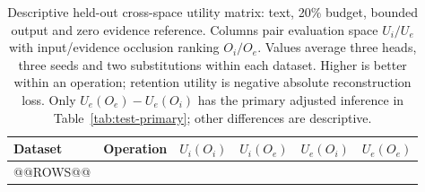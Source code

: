 \begin{table}[!htbp]\centering\small
\caption{Descriptive held-out cross-space utility matrix: text, 20\% budget, bounded output and zero evidence reference. Columns pair evaluation space $U_i/U_e$ with input/evidence occlusion ranking $O_i/O_e$. Values average three heads, three seeds and two substitutions within each dataset. Higher is better within an operation; retention utility is negative absolute reconstruction loss. Only $U_e(O_e)-U_e(O_i)$ has the primary adjusted inference in Table~\ref{tab:test-primary}; other differences are descriptive.}\label{tab:test-space-matrix}
\begin{tabular}{llrrrr}\toprule
Dataset & Operation & $U_i(O_i)$ & $U_i(O_e)$ & $U_e(O_i)$ & $U_e(O_e)$ \\\midrule
@@ROWS@@
\bottomrule\end{tabular}
\end{table}
